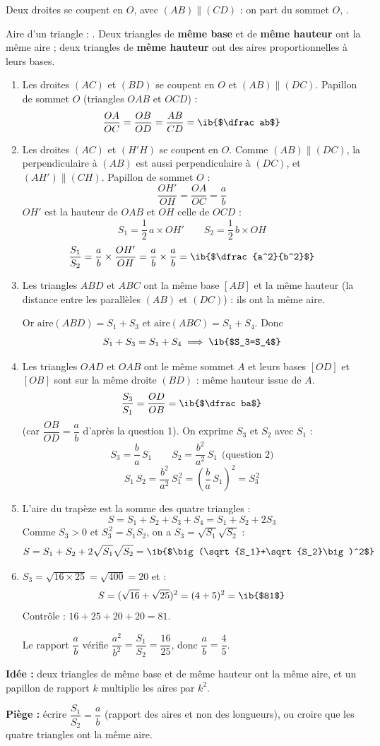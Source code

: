 \begin{prop}
Deux droites se coupent en $O$, avec $(AB)\parallel(CD)$ : on part du sommet $O$, .

Aire d'un triangle : . Deux triangles de \textbf{même base} et de \textbf{même hauteur} ont la même aire ; deux triangles de \textbf{même hauteur} ont des aires proportionnelles à leurs bases.
\end{prop}
\begin{enumerate}
  \item Les droites $(AC)$ et $(BD)$ se coupent en $O$ et $(AB)\parallel(DC)$. Papillon de sommet $O$ (triangles $OAB$ et $OCD$) :
  \[\dfrac{OA}{OC}=\dfrac{OB}{OD}=\dfrac{AB}{CD}=\ib{$\dfrac ab$}\]

  \item Les droites $(AC)$ et $(H'H)$ se coupent en $O$. Comme $(AB)\parallel(DC)$, la perpendiculaire à $(AB)$ est aussi perpendiculaire à $(DC)$, et $(AH')\parallel(CH)$. Papillon de sommet $O$ :
  \[\dfrac{OH'}{OH}=\dfrac{OA}{OC}=\dfrac ab\]
  $OH'$ est la hauteur de $OAB$ et $OH$ celle de $OCD$ :
  \[S_1=\dfrac12\,a\times OH'\qquad S_2=\dfrac12\,b\times OH\]
  \[\dfrac{S_1}{S_2}=\dfrac ab\times\dfrac{OH'}{OH}=\dfrac ab\times\dfrac ab=\ib{$\dfrac{a^2}{b^2}$}\]

  \item Les triangles $ABD$ et $ABC$ ont la même base $[AB]$ et la même hauteur (la distance entre les parallèles $(AB)$ et $(DC)$) : ils ont la même aire.

  Or $\text{aire}(ABD)=S_1+S_3$ et $\text{aire}(ABC)=S_1+S_4$. Donc
  \[S_1+S_3=S_1+S_4\implies\ib{$S_3=S_4$}\]

  \item Les triangles $OAD$ et $OAB$ ont le même sommet $A$ et leurs bases $[OD]$ et $[OB]$ sont sur la même droite $(BD)$ : même hauteur issue de $A$.
  \[\dfrac{S_3}{S_1}=\dfrac{OD}{OB}=\ib{$\dfrac ba$}\]
  (car $\dfrac{OB}{OD}=\dfrac ab$ d'après la question 1). On exprime $S_3$ et $S_2$ avec $S_1$ :
  \[S_3=\dfrac ba\,S_1\qquad S_2=\dfrac{b^2}{a^2}\,S_1\ \ \text{(question 2)}\]
  \[S_1\,S_2=\dfrac{b^2}{a^2}\,S_1^{\,2}=\left(\dfrac ba\,S_1\right)^2=S_3^{\,2}\]

  \item L'aire du trapèze est la somme des quatre triangles :
  \[S=S_1+S_2+S_3+S_4=S_1+S_2+2S_3\]
  Comme $S_3>0$ et $S_3^{\,2}=S_1S_2$, on a $S_3=\sqrt{S_1}\sqrt{S_2}$ :
  \[S=S_1+S_2+2\sqrt{S_1}\sqrt{S_2}=\ib{$\big(\sqrt{S_1}+\sqrt{S_2}\big)^2$}\]

  \item $S_3=\sqrt{16\times25}=\sqrt{400}=\boxed{20}$ et :
  \[S=(\sqrt{16}+\sqrt{25})^2=(4+5)^2=\ib{$81$}\]
  Contrôle : $16+25+20+20=81$.

  Le rapport $\dfrac ab$ vérifie $\dfrac{a^2}{b^2}=\dfrac{S_1}{S_2}=\dfrac{16}{25}$, donc $\dfrac ab=\boxed{\dfrac45}$.
\end{enumerate}
\textbf{Idée :} deux triangles de même base et de même hauteur ont la même aire, et un papillon de rapport $k$ multiplie les aires par $k^2$.

\textbf{Piège :} écrire $\dfrac{S_1}{S_2}=\dfrac ab$ (rapport des aires et non des longueurs), ou croire que les quatre triangles ont la même aire.
